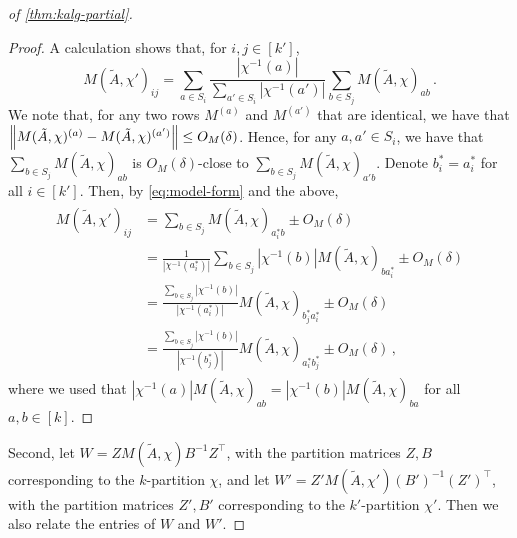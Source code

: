 \begin{proof}[of \cref{thm:kalg-partial}]
    \begin{proof}
    A calculation shows that, for $i, j \in [k']$,
    \begin{equation}
    \label{eq:model-form}
    M(\tilde{A}, \chi')_{ij} = \sum_{a \in S_i} \frac{|\chi^{-1}(a)|}{\sum_{a' \in S_i} |\chi^{-1}(a')|} \sum_{b \in S_j} M(\tilde{A}, \chi)_{ab}\,.
    \end{equation}
    We note that, for any two rows $M^{(a)}$ and $M^{(a')}$ that are identical, we have that\linebreak $\left\lVert M(\tilde{A}, \chi)^{(a)} - M(\tilde{A}, \chi)^{(a')}\right\rVert \leq O_M(\delta)$.
    Hence, for any $a, a' \in S_i$, we have that $\sum_{b \in S_j} M(\tilde{A}, \chi)_{ab}$ is $O_M(\delta)$-close to $\sum_{b \in S_j} M(\tilde{A}, \chi)_{a'b}$.
    Denote $b_i^* = a_i^*$ for all $i \in [k']$.
    Then, by \cref{eq:model-form} and the above,
    \begin{align*}
    \begin{split}
    \label{eq:mchi}
    M(\tilde{A}, \chi')_{ij}
    &= \sum_{b \in S_j} M(\tilde{A}, \chi)_{a^*_i b} \pm O_M(\delta)\\
    &= \frac{1}{|\chi^{-1}(a^*_i)|} \sum_{b \in S_j} |\chi^{-1}(b)| M(\tilde{A}, \chi)_{b a^*_i} \pm O_M(\delta)\\
    &= \frac{\sum_{b \in S_j} |\chi^{-1}(b)|}{|\chi^{-1}(a^*_i)|} M(\tilde{A}, \chi)_{b^*_{j} a^*_i} \pm O_M(\delta)\\
    &= \frac{\sum_{b \in S_j} |\chi^{-1}(b)|}{|\chi^{-1}(b^*_j)|} M(\tilde{A}, \chi)_{a^*_ib^*_{j}} \pm O_M(\delta)\,,
    \end{split}
    \end{align*}
    where we used that $|\chi^{-1}(a)| M(\tilde{A},\chi)_{ab} = |\chi^{-1}(b)| M(\tilde{A},\chi)_{ba}$ for all $a, b \in [k]$.
    \end{proof}

    Second, let $W = Z M(\tilde{A}, \chi) B^{-1} Z^\top$, with the partition matrices $Z, B$ corresponding to the $k$-partition $\chi$, and let $W' = Z' M(\tilde{A}, \chi') (B')^{-1} (Z')^\top$, with the partition matrices $Z', B'$ corresponding to the $k'$-partition $\chi'$.
    Then we also relate the entries of $W$ and $W'$.


\end{proof}
